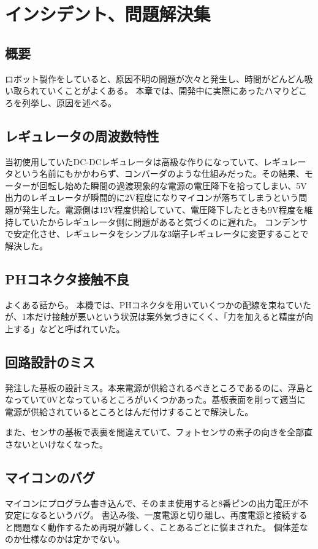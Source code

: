 \documentclass{ltjsreport}
\begin{document}
\chapter{インシデント、問題解決集}
\section{概要}
ロボット製作をしていると、原因不明の問題が次々と発生し、時間がどんどん吸い取られていくことがよくある。
本章では、開発中に実際にあったハマりどころを列挙し、原因を述べる。


\section{レギュレータの周波数特性}
当初使用していたDC-DCレギュレータは高級な作りになっていて、レギュレータという名前にもかかわらず、コンバーダのような仕組みだった。その結果、モーターが回転し始めた瞬間の過渡現象的な電源の電圧降下を拾ってしまい、5V出力のレギュレータが瞬間的に2V程度になりマイコンが落ちてしまうという問題が発生した。電源側は12V程度供給していて、電圧降下したときも9V程度を維持していたからレギュレータ側に問題があると気づくのに遅れた。
コンデンサで安定化させ、レギュレータをシンプルな3端子レギュレータに変更することで解決した。

\section{PHコネクタ接触不良}
よくある話から。
本機では、PHコネクタを用いていくつかの配線を束ねていたが、1本だけ接触が悪いという状況は案外気づきにくく、「力を加えると精度が向上する」などと呼ばれていた。

\section{回路設計のミス}
発注した基板の設計ミス。本来電源が供給されるべきところであるのに、浮島となっていて0Vとなっているところがいくつかあった。基板表面を削って適当に電源が供給されているところとはんだ付けすることで解決した。

また、センサの基板で表裏を間違えていて、フォトセンサの素子の向きを全部直さないといけなくなった。

\section{マイコンのバグ}
マイコンにプログラム書き込んで、そのまま使用すると8番ピンの出力電圧が不安定になるというバグ。
書込み後、一度電源と切り離し、再度電源と接続すると問題なく動作するため再現が難しく、ことあるごとに悩まされた。
個体差なのか仕様なのかは定かでない。
\end{document}
